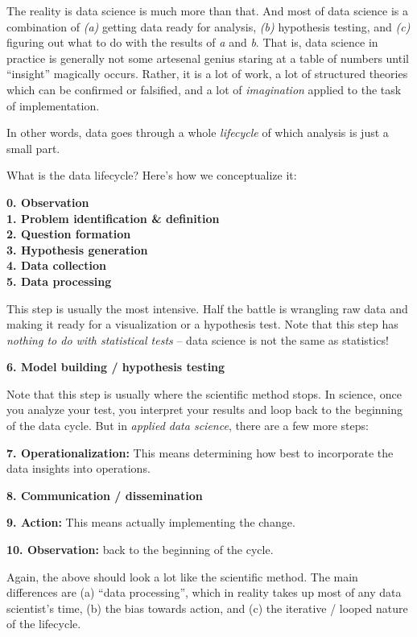 \documentclass[]{book}
\begin{document}
The reality is data science is much more than that. And most of data science is a combination of \emph{(a)} getting data ready for analysis, \emph{(b)} hypothesis testing, and \emph{(c)} figuring out what to do with the results of \emph{a} and \emph{b}. That is, data science in practice is generally not some artesenal genius staring at a table of numbers until ``insight'' magically occurs. Rather, it is a lot of work, a lot of structured theories which can be confirmed or falsified, and a lot of \emph{imagination} applied to the task of implementation.

In other words, data goes through a whole \emph{lifecycle} of which analysis is just a small part.

What is the data lifecycle? Here's how we conceptualize it:

\textbf{0. Observation}\\
\textbf{1. Problem identification \& definition}\\
\textbf{2. Question formation}\\
\textbf{3. Hypothesis generation}\\
\textbf{4. Data collection}\\
\textbf{5. Data processing}

This step is usually the most intensive. Half the battle is wrangling raw data and making it ready for a visualization or a hypothesis test. Note that this step has \emph{nothing to do with statistical tests} -- data science is not the same as statistics!

\textbf{6. Model building / hypothesis testing}

Note that this step is usually where the scientific method stops. In science, once you analyze your test, you interpret your results and loop back to the beginning of the data cycle. But in \emph{applied data science}, there are a few more steps:

\textbf{7. Operationalization:} This means determining how best to incorporate the data insights into operations.

\textbf{8. Communication / dissemination}

\textbf{9. Action:} This means actually implementing the change.

\textbf{10. Observation:} back to the beginning of the cycle.

Again, the above should look a lot like the scientific method. The main differences are (a) ``data processing'', which in reality takes up most of any data scientist's time, (b) the bias towards action, and (c) the iterative / looped nature of the lifecycle.
\end{document}
